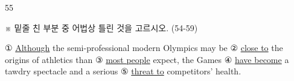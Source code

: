\begin{question}{55}
\begin{framedtext}
※ 밑줄 친 부분 중 어법상 틀린 것을 고르시오. (54-59) \par
\end{framedtext}
① \uline{Although} the semi-professional modern Olympics may be ② \uline{close to} the origins of athletics than ③ \uline{most people} expect, the Games ④ \uline{have become} a tawdry spectacle and a serious ⑤ \uline{threat to} competitors' health.
\end{question}

